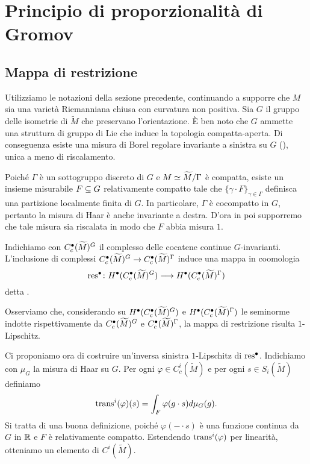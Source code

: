 \section{Principio di proporzionalità di Gromov}

\subsection{Mappa di restrizione}
Utilizziamo le notazioni della sezione precedente, continuando a supporre che $M$ sia una varietà Riemanniana chiusa con curvatura non positiva. Sia $G$ il gruppo delle isometrie di $\widetilde M$ che preservano l'orientazione. È ben noto che $G$ ammette una struttura di gruppo di Lie che induce la topologia compatta-aperta. Di conseguenza esiste una misura di Borel regolare invariante a sinistra su $G$ (), unica a meno di riscalamento.

Poiché $\Gamma$ è un sottogruppo discreto di $G$ e $M\simeq\widetilde M/\Gamma$ è compatta, esiste un insieme misurabile $F\subseteq G$ relativamente compatto tale che $\{\gamma\cdot F\}_{\gamma\in\Gamma}$ definisca una partizione localmente finita di $G$. In particolare, $\Gamma$ è cocompatto in $G$, pertanto la misura di Haar è anche invariante a destra. D'ora in poi supporremo che tale misura sia riscalata in modo che $F$ abbia misura $1$.

\begin{definition}
Indichiamo con $C^\bullet_c(\widetilde M)^G$ il complesso delle cocatene continue $G$-invarianti. L'inclusione di complessi $\umap{C^\bul_c(\widetilde M)^G}{C^\bul_c(\widetilde M)^\Gamma}$ induce una mappa in coomologia
\[
\map{\res^\bul}{H^\bul(C^\bul_c(\widetilde M)^G)}{H^\bul(C^\bul_c(\widetilde M)^\Gamma)}
\]
detta .
\end{definition}

Osserviamo che, considerando su $H^\bullet(C^\bullet_c(\widetilde M)^G)$ e $H^\bullet(C^\bullet_c(\widetilde M)^\Gamma)$ le seminorme indotte rispettivamente da $C^\bullet_c(\widetilde M)^G$ e $C^\bullet_c(\widetilde M)^\Gamma$, la mappa di restrizione risulta $1$-Lipschitz.

Ci proponiamo ora di costruire un'inversa sinistra $1$-Lipschitz di $\operatorname{res}^\bullet$. Indichiamo con $\mu_G$ la misura di Haar su $G$. Per ogni $\varphi\in C^i_c(\widetilde M)$ e per ogni $s\in S_i(\widetilde M)$ definiamo
\[
\operatorname{trans}^i(\varphi)(s)=\int_F\varphi(g\cdot s)d\mu_G(g).
\]
Si tratta di una buona definizione, poiché $\varphi({-}\cdot s)$ è una funzione continua da $G$ in $\mathbb{R}$ e $F$ è relativamente compatto. Estendendo $\operatorname{trans}^i(\varphi)$ per linearità, otteniamo un elemento di $C^i(\widetilde M)$.

